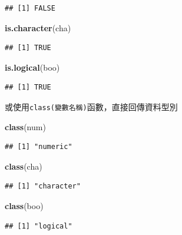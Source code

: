 \documentclass[]{book}
\newenvironment{Shaded}{\begin{snugshade}}{\end{snugshade}}
\newcommand{\KeywordTok}[1]{\textcolor[rgb]{0.13,0.29,0.53}{\textbf{{#1}}}}
\newcommand{\NormalTok}[1]{{#1}}
\theoremstyle{definition}
\theoremstyle{definition}
\theoremstyle{remark}
\begin{document}
\begin{verbatim}
## [1] FALSE
\end{verbatim}

\begin{Shaded}
\begin{Highlighting}[]
\KeywordTok{is.character}\NormalTok{(cha)}
\end{Highlighting}
\end{Shaded}

\begin{verbatim}
## [1] TRUE
\end{verbatim}

\begin{Shaded}
\begin{Highlighting}[]
\KeywordTok{is.logical}\NormalTok{(boo)}
\end{Highlighting}
\end{Shaded}

\begin{verbatim}
## [1] TRUE
\end{verbatim}

或使用\texttt{class(變數名稱)}函數，直接回傳資料型別

\begin{Shaded}
\begin{Highlighting}[]
\KeywordTok{class}\NormalTok{(num)}
\end{Highlighting}
\end{Shaded}

\begin{verbatim}
## [1] "numeric"
\end{verbatim}

\begin{Shaded}
\begin{Highlighting}[]
\KeywordTok{class}\NormalTok{(cha)}
\end{Highlighting}
\end{Shaded}

\begin{verbatim}
## [1] "character"
\end{verbatim}

\begin{Shaded}
\begin{Highlighting}[]
\KeywordTok{class}\NormalTok{(boo)}
\end{Highlighting}
\end{Shaded}

\begin{verbatim}
## [1] "logical"
\end{verbatim}
\end{document}
